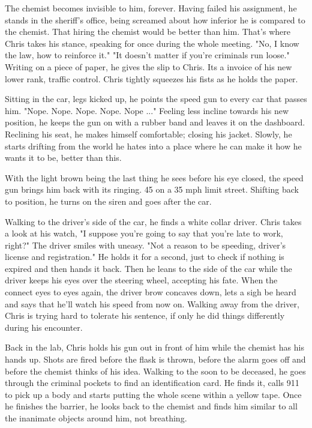         The chemist becomes invisible to him, forever. Having failed his assignment, he stands in the sheriff's office, being screamed about
    how inferior he is compared to the chemist. That hiring the chemist would be better than him. That's where Chris takes his stance, speaking
    for once during the whole meeting. "No, I know the law, how to reinforce it." "It doesn't matter if you're criminals run loose." Writing
    on a piece of paper, he gives the slip to Chris. Its a invoice of his new lower rank, traffic control. Chris tightly squeezes his fists
    as he holds the paper.

        Sitting in the car, legs kicked up, he points the speed gun to every car that passes him. "Nope. Nope. Nope. Nope. Nope ..." Feeling
    less incline towards his new position, he keeps the gun on with a rubber band and leaves it on the dashboard. Reclining his seat, he makes
    himself comfortable; closing his jacket. Slowly, he starts drifting from the world he hates into a place where he can make it how he wants
    it to be, better than this.

        With the light brown being the last thing he sees before his eye closed, the speed gun brings him back with its ringing. 45 on a 35 mph
    limit street. Shifting back to position, he turns on the siren and goes after the car.

        Walking to the driver's side of the car, he finds a white collar driver. Chris takes a look at his watch, "I suppose you're going to
    say that you're late to work, right?" The driver smiles with uneasy. "Not a reason to be speeding, driver's license and registration." He
    holds it for a second, just to check if nothing is expired and then hands it back. Then he leans to the side of the car while the driver
    keeps his eyes over the steering wheel, accepting his fate. When the connect eyes to eyes again, the driver brow concaves down, lets a sigh
    be heard and says that he'll watch his speed from now on. Walking away from the driver, Chris is trying hard to tolerate his sentence, if 
    only he did things differently during his encounter.

        Back in the lab, Chris holds his gun out in front of him while the chemist has his hands up. Shots are fired before the flask is thrown,
    before the alarm goes off and before the chemist thinks of his idea. Walking to the soon to be deceased, he goes through the criminal 
    pockets to find an identification card. He finds it, calls 911 to pick up a body and starts putting the whole scene within a yellow tape.
    Once he finishes the barrier, he looks back to the chemist and finds him similar to all the inanimate objects around him, not breathing.

